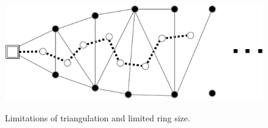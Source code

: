 \begin{figure}[h]
	\begin{centering}
		{\includegraphics[scale=0.9]{figures/approach/trifail.pdf}}
		\caption{Limitations of triangulation and limited ring size.}
		\label{fig:trifail}
	\end{centering}
\end{figure}
